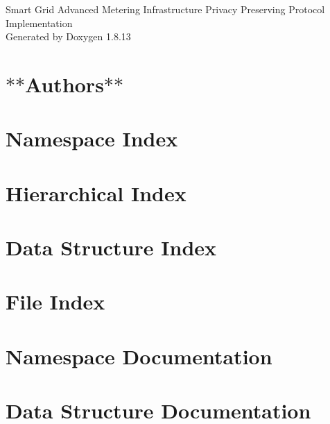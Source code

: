 \documentclass[twoside]{book}
\newcommand{\+}{\discretionary{\mbox{\scriptsize$\hookleftarrow$}}{}{}}
\newcommand{\clearemptydoublepage}{%
  \newpage{\pagestyle{empty}\cleardoublepage}%
}
\begin{document}
\hypersetup{pageanchor=false,
             bookmarksnumbered=true,
             pdfencoding=unicode
            }
\begin{titlepage}
\vspace*{7cm}
\begin{center}%
{\Large Smart Grid Advanced Metering Infrastructure Privacy Preserving Protocol Implementation }\\
\vspace*{1cm}
{\large Generated by Doxygen 1.8.13}\\
\end{center}
\end{titlepage}
\clearemptydoublepage
{}
\tableofcontents
\clearemptydoublepage
{}
\hypersetup{pageanchor=true}

\chapter{$\ast$$\ast$\+Authors$\ast$$\ast$}
\label{index}\hypertarget{index}{}
\chapter{Namespace Index}

\chapter{Hierarchical Index}

\chapter{Data Structure Index}

\chapter{File Index}

\chapter{Namespace Documentation}



\chapter{Data Structure Documentation}




























\end{document}
